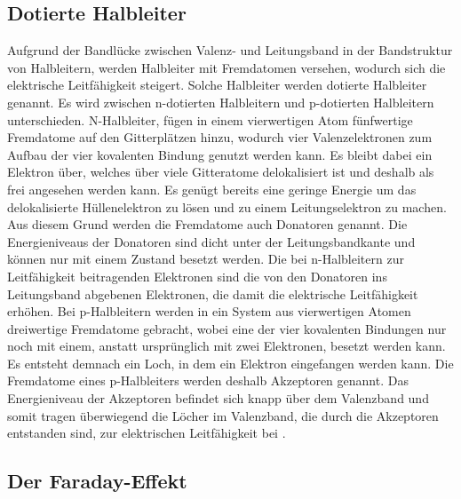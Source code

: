 \subsection{Dotierte Halbleiter}
\label{subsec:dotHalbleiter}

Aufgrund der Bandlücke zwischen Valenz- und Leitungsband in der Bandstruktur von Halbleitern, werden Halbleiter mit Fremdatomen versehen, wodurch sich die
elektrische Leitfähigkeit steigert. Solche Halbleiter werden dotierte Halbleiter genannt. Es wird zwischen n-dotierten Halbleitern und p-dotierten Halbleitern unterschieden.
N-Halbleiter, fügen in einem vierwertigen Atom fünfwertige Fremdatome auf den Gitterplätzen hinzu, wodurch vier Valenzelektronen zum Aufbau der
vier kovalenten Bindung genutzt werden kann. Es bleibt dabei ein Elektron über, welches über viele Gitteratome delokalisiert ist und deshalb als frei angesehen werden kann. Es genügt
bereits eine geringe Energie um das delokalisierte Hüllenelektron zu lösen und zu einem Leitungselektron zu machen. Aus diesem Grund werden die Fremdatome auch Donatoren genannt.
Die Energieniveaus der Donatoren sind dicht unter der Leitungsbandkante und können nur mit einem Zustand besetzt werden. Die bei n-Halbleitern zur Leitfähigkeit beitragenden
Elektronen sind die von den Donatoren ins Leitungsband abgebenen Elektronen, die damit die elektrische Leitfähigkeit erhöhen. \newline
Bei p-Halbleitern werden in ein System aus vierwertigen Atomen dreiwertige Fremdatome gebracht, wobei eine der vier kovalenten Bindungen nur noch mit einem, anstatt ursprünglich mit
zwei Elektronen, besetzt werden kann. Es entsteht demnach ein Loch, in dem ein Elektron eingefangen werden kann. Die Fremdatome eines p-Halbleiters werden deshalb  Akzeptoren genannt.
Das Energieniveau der Akzeptoren befindet sich knapp über dem Valenzband und somit tragen überwiegend die Löcher im Valenzband, die durch die Akzeptoren entstanden sind, zur elektrischen
Leitfähigkeit bei \cite{Demtröder3}.

\subsection{Der Faraday-Effekt}
\label{subsec:Der Faraday-Effekt}

